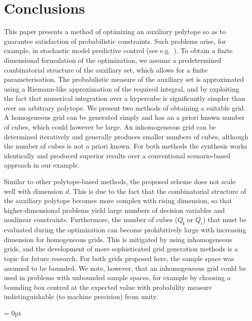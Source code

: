 \documentclass[letterpaper, 10pt, conference]{ieeeconf} %
\providecommand{\bfa}[1]{\mathbf{#1}}
\begin{document}
\section{Conclusions}\label{sec:conclusion}
%
%
%
%
%
\noindent This paper presents a method of optimizing an auxiliary polytope so as to guarantee satisfaction of probabilistic constraints. Such problems arise, for example, in stochastic model predictive control (see e.g.~\cite{Zhang2015,Fleming2016}).
%
To obtain a finite dimensional formulation of the optimization, we assume a predetermined combinatorial structure of the auxiliary set, which allows for a finite parameterisation. 
%
The probabilistic measure of the auxiliary set is approximated using a Riemann-like approximation of the required integral, and by exploiting the fact that numerical integration over a hypercube is significantly simpler than over an arbitrary polytope.
%
We present two methods of obtaining a suitable grid. A homogeneous grid can be generated simply and has an a priori known number of cubes, which could however be large.
%
An inhomogeneous grid can be determined iteratively and generally produces smaller numbers of cubes, although the number of cubes is not a priori known.
%
For both methods the synthesis works identically and produced superior results over a conventional scenario-based approach in our example.
%


%
Similar to other polytope-based methods, the proposed scheme does not scale well with dimension $d$. This is due to the fact that the combinatorial structure of the auxiliary polytope becomes more complex with rising dimension, so that higher-dimensional problems yield large numbers of decision variables and nonlinear constraints.
%
Furthermore, the number of cubes ($Q_\bfa{i}$ or $Q_i$) that must be evaluated during the optimization can become prohibitively large with increasing dimension for homogeneous grids. This is mitigated by using inhomogeneous grids, and the development of more sophisticated grid generation methods is a  topic for future research.
%
For both grids proposed here, the sample space was assumed to be bounded. We note, however, that an inhomogeneous grid could be used in problems with unbounded sample spaces, for example by choosing a bounding box centred at the expected value with probability measure indistinguishable (to machine precision) from unity.


\parskip = 0pt

\end{document}
